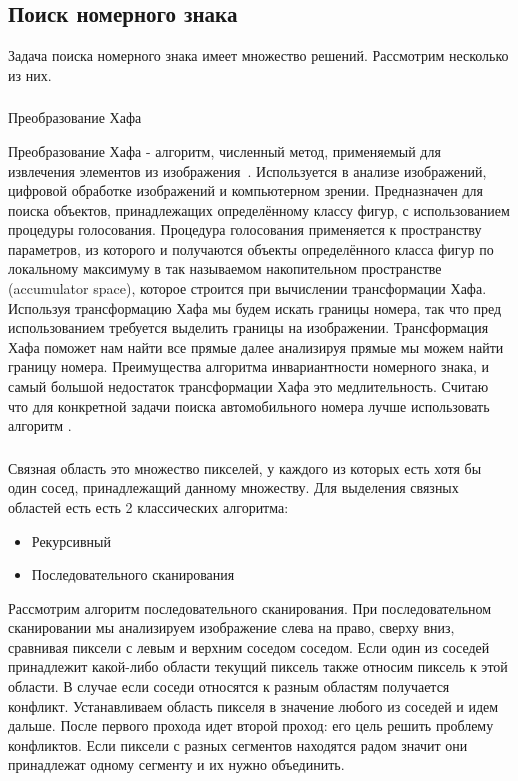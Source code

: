 \subsection{Поиск номерного знака}
\label{sub:temp:search}
Задача поиска номерного знака имеет множество решений. Рассмотрим несколько из них.
\subsubsection{}
\label{sub:temp:search:hought}
Преобразование Хафа

Преобразование Хафа - алгоритм, численный метод, применяемый для извлечения элементов из изображения~\cite{hough_transform}. Используется в анализе изображений, цифровой обработке изображений и компьютерном зрении. Предназначен для поиска объектов, принадлежащих определённому классу фигур, с использованием процедуры голосования. Процедура голосования применяется к пространству параметров, из которого и получаются объекты определённого класса фигур по локальному максимуму в так называемом накопительном пространстве (accumulator space), которое строится при вычислении трансформации Хафа. Используя трансформацию Хафа мы будем искать границы номера, так что пред использованием требуется выделить границы на изображении. Трансформация Хафа поможет нам найти все прямые далее анализируя прямые мы можем найти границу номера. Преимущества алгоритма инвариантности номерного знака, и самый большой недостаток трансформации Хафа это медлительность. Считаю что для конкретной задачи поиска автомобильного номера лучше использовать алгоритм \segmentation.

\subsubsection{}
\label{sub:temp:search:segmentation}
\segmentation{}

Связная область это множество пикселей, у каждого из которых есть хотя бы один сосед, принадлежащий данному множеству. Для выделения связных областей есть есть 2 классических алгоритма:
\begin{itemize}
  \item Рекурсивный
  \item Последовательного сканирования
\end{itemize}
Рассмотрим алгоритм последовательного сканирования. При последовательном сканировании мы анализируем изображение слева на право, сверху вниз, сравнивая пиксели с левым и верхним соседом соседом. Если один из соседей принадлежит какой-либо области текущий пиксель также относим пиксель к этой области. В случае если соседи относятся к разным областям получается конфликт. Устанавливаем область пикселя в значение любого из соседей и идем дальше. После первого прохода идет второй проход: его цель решить проблему конфликтов. Если пиксели с разных сегментов находятся радом значит они принадлежат одному сегменту и их нужно объединить. 

